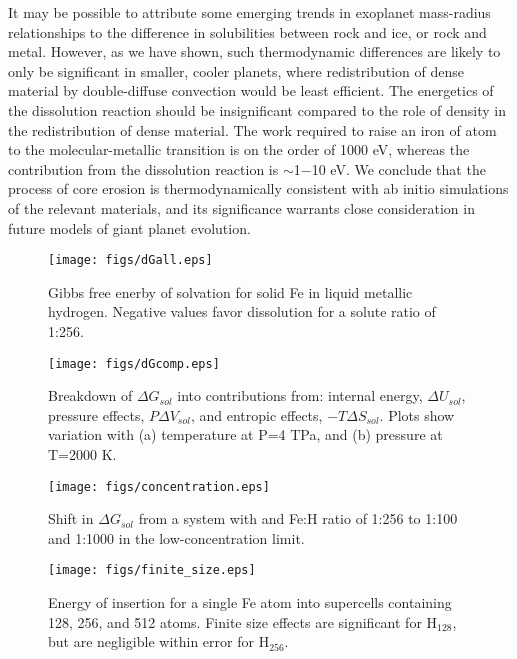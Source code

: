 It may be possible to attribute some
emerging trends in exoplanet mass-radius relationships to the difference in
solubilities between rock and ice, or rock and metal. However, as we have
shown, such thermodynamic differences are likely to only be significant in
smaller, cooler planets, where redistribution of dense material by
double-diffuse convection would be least efficient. The energetics of the
dissolution reaction should be insignificant compared to the role of density
in the redistribution of dense material. The work required to raise an iron of atom to
the molecular-metallic transition is on the order of 1000 eV, whereas the
contribution from the dissolution reaction is $\sim$1$-$10 eV. We conclude
that the process of core erosion is thermodynamically consistent with ab
initio simulations of the relevant materials, and its
significance warrants close consideration in future models of giant planet
evolution.

 \begin{figure}[H] %
   \centering
   \texttt{[image: figs/dGall.eps]} 
\caption{Gibbs free enerby of solvation for solid Fe in liquid metallic
hydrogen. Negative values favor dissolution for a solute ratio of 1:256.}
\end{figure}

 \begin{figure}[H] %
   \centering
   \texttt{[image: figs/dGcomp.eps]} 
\caption{Breakdown of $\Delta G_{sol}$ into contributions from: internal
energy,
$\Delta U_{sol}$, pressure effects, $P\Delta V_{sol}$, and entropic effects,
$-T\Delta S_{sol}$. Plots show variation with (a) temperature at P=4 TPa, and
(b) pressure at T=2000 K.}
\end{figure}

 \begin{figure}[H] %
   \centering
   \texttt{[image: figs/concentration.eps]} 
\caption{Shift in $\Delta G_{sol}$ from a system with and Fe:H ratio of 1:256 to 1:100 and
1:1000 in the low-concentration limit.}
\end{figure}

 \begin{figure}[H] %
   \centering
   \texttt{[image: figs/finite\_size.eps]} 
\caption{Energy of insertion for a single Fe atom into supercells containing
128, 256, and 512 atoms. Finite size effects are significant
for $\mathrm{H}_{128}$, but are negligible within error for $\mathrm{H}_{256}$.}
\end{figure}

